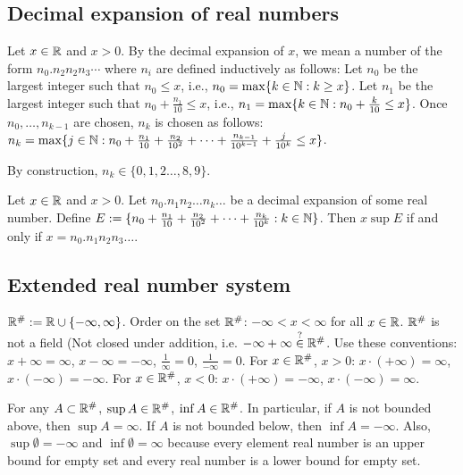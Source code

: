 \documentclass[]{article}
\begin{document}
\subsection*{Decimal expansion of real numbers}

Let $x\in\mathbb{R}$ and $x>0$. By the decimal expansion of $x$, we mean a number of the form $n_0. n_2 n_2 n_3\cdots$ where $n_i$ are defined inductively as follows:
Let $n_0$ be the largest integer such that $n_0\leq x$, i.e., $n_0 = \max\{k\in\mathbb{N}: k\geq x\}$. Let $n_1$ be the largest integer such that $n_0 + \frac{n_1}{10} \leq x$, i.e., $n_1 = \max\{k\in\mathbb{N} : n_0 + \frac{k}{10} \leq x\}$. Once $n_0,\dots,n_{k-1}$ are chosen, $n_k$ is chosen as follows: $n_k = \max\{j\in\mathbb{N}: n_0 + \frac{n_1}{10} + \frac{n_2}{10^2} + \cdots + \frac{n_{k-1}}{10^{k-1}} + \frac{j}{10^k} \leq x\}$.
\begin{note}
	By construction, $n_k\in\{0,1,2\dots,8,9\}$.
\end{note}
\begin{remark}
	Let $x\in\mathbb{R}$ and $x>0$. Let $n_0.n_1n_2\dots n_k\dots$ be a decimal expansion of some real number. Define $E:=\{n_0 + \frac{n_1}{10} + \frac{n_2}{10^2} + \dots + \frac{n_k}{10^k} : k\in\mathbb{N}\}$. Then $x\sup E$ if and only if $x = n_0.n_1n_2n_3\dots$.
\end{remark}

\subsection*{Extended real number system}

$\mathbb{R}^\# := \mathbb{R}\cup\{-\infty,\infty\}$. Order on the set $\mathbb{R}^\#$: $-\infty < x<\infty$ for all $x\in\mathbb{R}$. $\mathbb{R}^\#$ is not a field (Not closed under  addition, i.e. $-\infty + \infty \overset{?}{\in}\mathbb{R}^\#$. Use these conventions: $x+\infty = \infty$, $x-\infty = -\infty$, $\frac{1}{\infty} = 0$, $\frac{1}{-\infty} = 0$. For $x\in\mathbb{R}^\#$, $x>0$: $x\cdot(+\infty) = \infty$, $x\cdot (-\infty) = -\infty$. For $x\in\mathbb{R}^\#$, $x<0$: $x\cdot(+\infty) = -\infty$, $x\cdot(-\infty) = \infty$.

For any $A\subset \mathbb{R}^\#$, $\sup A\in\mathbb{R}^\#$, $\inf A\in\mathbb{R}^\#$. In particular, if $A$ is not bounded above, then $\sup A = \infty$. If $A$ is not bounded below, then $\inf A = -\infty$. Also, $\sup \emptyset = -\infty$ and $\inf \emptyset = \infty$ because every element real number is an upper bound for empty set and every real number is a lower bound for empty set.
\end{document}
